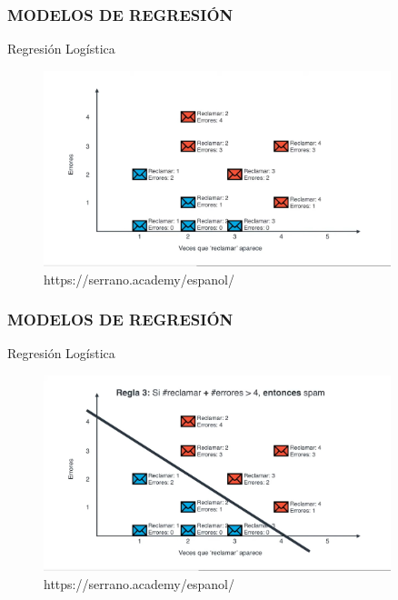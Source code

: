\documentclass{beamer}
\begin{document}
\begin{frame}
	\frametitle{MODELOS DE REGRESIÓN}
	\begin{block}{Regresión Logística}	
		\begin{figure}
			\includegraphics[width=0.9\textwidth]{Imagenes_reg_log/IMG_3499.jpg}
			\caption{https://serrano.academy/espanol/}
		\end{figure}
	\end{block}
\end{frame}

\begin{frame}
	\frametitle{MODELOS DE REGRESIÓN}
	\begin{block}{Regresión Logística}	
		\begin{figure}
			\includegraphics[width=0.9\textwidth]{Imagenes_reg_log/IMG_3500.jpg}
			\caption{https://serrano.academy/espanol/}
		\end{figure}
	\end{block}
\end{frame}
\end{document}
